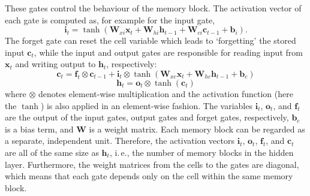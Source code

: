 These gates control the behaviour of the memory block.
The activation vector of each gate is computed as, for example for the input gate,
\begin{equation}
\boldsymbol{i}_t = \tanh(\boldsymbol{W}_{xi}\boldsymbol{x}_t + \boldsymbol{W}_{hi}\boldsymbol{h}_{t-1} + \boldsymbol{W}_{ci}\boldsymbol{c}_{t-1} + \boldsymbol{b}_i).
\label{eq:lstmgate}
\end{equation}
The forget gate can reset the cell variable which leads to `forgetting' the stored input $\boldsymbol{c}_t$,
while the input and output gates are responsible for reading input from $\boldsymbol{x}_t$ and writing output to $\boldsymbol{h}_t$, respectively:
\begin{equation}
\boldsymbol{c}_t = \boldsymbol{f}_t \otimes \boldsymbol{c}_{t-1} + \boldsymbol{i}_t \otimes \tanh(\boldsymbol{W}_{xc}\boldsymbol{x}_t + \boldsymbol{W}_{hc}\boldsymbol{h}_{t-1} + \boldsymbol{b}_c)
\label{eq:lstmcell}
\end{equation}
\begin{equation}
\boldsymbol{h}_t = \boldsymbol{o}_t \otimes \tanh (\boldsymbol{c}_t)
\label{eq:lstmoutput}
\end{equation}
where $\otimes$ denotes element-wise multiplication and the activation function (here the $\tanh$) is also applied in an element-wise fashion.
The variables $\boldsymbol{i}_t$, $\boldsymbol{o}_t$, and $\boldsymbol{f}_t$ are the output of the input gates, output gates and forget gates, respectively, $\boldsymbol{b}_c$ is a bias term, and $\boldsymbol{W}$ is a weight matrix.
Each memory block can be regarded as a separate, independent unit.
Therefore, the activation vectors $\boldsymbol{i}_t$, $\boldsymbol{o}_t$, $\boldsymbol{f}_t$, and $\boldsymbol{c}_t$ are all of the same size as $\boldsymbol{h}_t$, i.\,e., the number of memory blocks in the hidden layer.
Furthermore, the weight matrices from the cells to the gates are diagonal, which means that each gate depends only on the cell within the same memory block.


